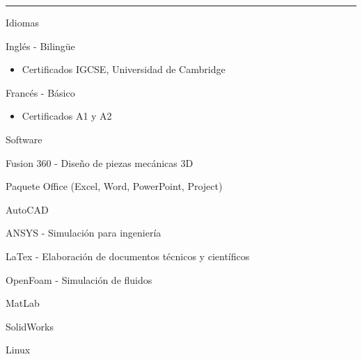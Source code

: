 \documentclass[a4paper,10pt]{article}
\newlength{\cvcolumngapwidth}
\newlength{\cvleftcolumnwidth}
\newlength{\cvrightcolumnwidth}
\newcommand{\cvsectionstyle}[1]{{\normalsize\cvsectionfont\textcolor{cvsectioncolor}{#1}}}
\newcommand{\cvheadingstyle}[1]{{\normalsize\cvheadingfont\textcolor{cvheadingcolor}{#1}}}
\newlength{\cvafteritemskipamount}
\newlength{\cvaftersectionskipamount}
\newlength{\cvbetweensectionandheadingextraskipamount}
\newlength{\cvparskip}
\newcommand{\cvsection}[1]{
    \begin{minipage}[t]{\cvleftcolumnwidth}
        \raggedleft\cvsectionstyle{#1}
    \end{minipage}%
    \hspace{\cvcolumngapwidth}%
    \begin{minipage}[t]{\cvrightcolumnwidth}
        \textcolor{cvrulecolor}{\rule{\cvrightcolumnwidth}{0.3mm}}
    \end{minipage}

    \vspace{\cvaftersectionskipamount}
}
\newcommand{\cvitem}[2]{
    \begin{minipage}[t]{\cvleftcolumnwidth}
        \raggedleft #1
    \end{minipage}%
    \hspace{\cvcolumngapwidth}%
    \begin{minipage}[t]{\cvrightcolumnwidth}
        \setlength{\parskip}{\cvparskip} #2
    \end{minipage}

    \vspace{\cvafteritemskipamount}
}
\begin{document}
\newpage
\cvsection{HABILIDADES}

\vspace{\cvbetweensectionandheadingextraskipamount}

\cvitem{
    \cvheadingstyle{Idiomas}
}{
    Inglés - Bilingüe
    \begin{itemize}
        \item Certificados IGCSE, Universidad de Cambridge
    \end{itemize}

    Francés - Básico
    \begin{itemize}
        \item Certificados A1 y A2
    \end{itemize}
}

\cvitem{
    \cvheadingstyle{Software}
}{
    Fusion 360 - Diseño de piezas mecánicas 3D
    
    Paquete Office (Excel, Word, PowerPoint, Project)

    AutoCAD
    
    ANSYS - Simulación para ingeniería
    
    LaTex - Elaboración de documentos técnicos y científicos
    
    OpenFoam - Simulación de fluidos

    MatLab

    SolidWorks

    Linux
}



%


\end{document}

